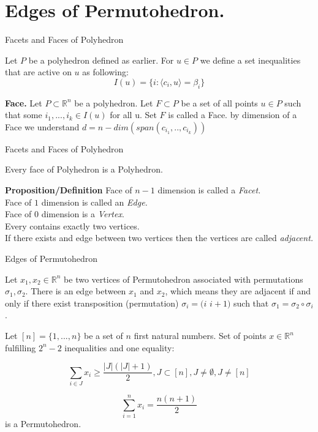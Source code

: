 \documentclass{beamer}
\theoremstyle{plain}
\theoremstyle{definition}
\begin{document}
\section{Edges of Permutohedron.}
\begin{frame}{Facets and Faces of Polyhedron}
    \begin{recall}
        Let $P$ be a polyhedron defined as earlier. For $u \in P$ we define a set inequalities that are active on $u$ as following:
        $$I(u) = \{i:\langle c_{i},u \rangle  = \beta_i \}$$
    \end{recall}
    \begin{definition}
        \textbf{Face.} Let $P \subset \mathbb{R}^n$ be a polyhedron. Let $F \subset P$ be a set of all points $u \in P$ such that some $i_1,...,i_k \in I(u)$ for all u. Set $F$ is called a Face. by dimension of a Face we understand $d = n - dim(span(c_{i_1},..,c_{i_k}))$ 
    \end{definition}
\end{frame} 
\begin{frame}{Facets and Faces of Polyhedron}
    \begin{theorem}
        Every face of Polyhedron is a Polyhedron.
    \end{theorem}
    \textbf{Proposition/Definition}
        Face of $n-1$ dimension is called a \textit{Facet.} \\
        Face of $1$ dimension is called an \textit{Edge.} \\
        Face of $0$ dimension is a \textit{Vertex}. \\
        Every  contains exactly two vertices.\\
        If there exists and edge between two vertices then the vertices are called \textit{adjacent.} 
\end{frame}
\begin{frame}{Edges of Permutohedron}
    \begin{theorem}
        Let $x_1,x_2 \in \mathbb{R}^n$ be two vertices of Permutohedron associated with permutations $\sigma_1,\sigma_2$. There is an edge between $x_1$ and $x_2$, which means they  are adjacent if and only if there exist transposition (permutation) $\sigma_{i} = (i$ $i+1)$ such that $\sigma_{1} = \sigma_{2} \circ \sigma_i$.
    \end{theorem}
    \pause
    \begin{definition}
        Let $[n] = \{1,...,n\}$ be a set of $n$ first natural numbers.
        Set of points $x \in \mathbb{R}^n$ fulfilling $2^n - 2$ inequalities and one equality:

           $$ \sum_{i \in J} x_i \geq \frac{|J|(|J|+1)}{2}, J \subset [n], J \neq \emptyset, J \neq  [n] $$

           $$ \sum_{i=1}^{n} x_i = \frac{n(n+1)}{2} $$
           is a Permutohedron.
    \end{definition}
\end{frame}
\end{document}
